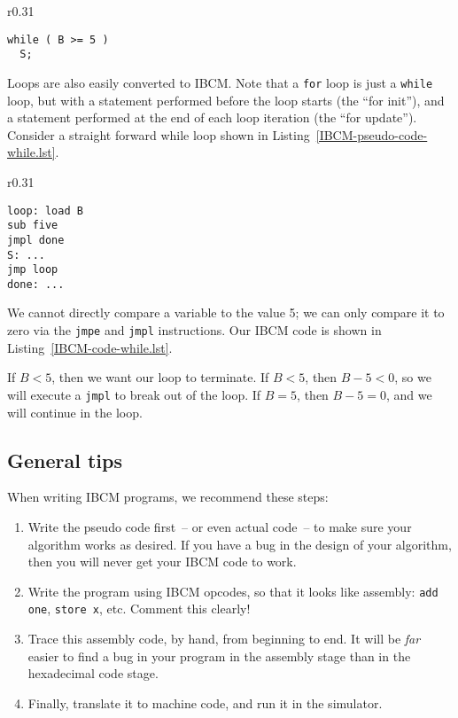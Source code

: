 \begin{wrapfigure}{r}{0.31\textwidth}
\vspace{0.1in}
\begin{lstlisting}[backgroundcolor=\color{white},frame=trBL,linewidth=2in,xleftmargin=0.25in,label={IBCM-pseudo-code-while.lst},caption={{\bf while} pseudo code}]
while ( B >= 5 )
  S;
\end{lstlisting}
\vspace{0.25in}
\end{wrapfigure}

Loops are also easily converted to IBCM.  Note that a {\tt for} loop
is just a {\tt while} loop, but with a statement performed before the
loop starts (the ``for init''), and a statement performed at the end
of each loop iteration (the ``for update'').  Consider a straight
forward while loop shown in Listing~\ref{IBCM-pseudo-code-while.lst}.

\begin{wrapfigure}{r}{0.31\textwidth}
\vspace{-0.7in}
\begin{lstlisting}[backgroundcolor=\color{white},frame=trBL,linewidth=2in,xleftmargin=0.25in,label={IBCM-code-while.lst},caption={IBCM {\bf while} code}]
loop: load B
sub five
jmpl done
S: ...
jmp loop
done: ...
\end{lstlisting}
\vspace{-0.5in}
\end{wrapfigure}

We cannot directly compare a variable to the value 5; we can only
compare it to zero via the {\tt jmpe} and {\tt jmpl} instructions.
Our IBCM code is shown in Listing~\ref{IBCM-code-while.lst}.

If $B<5$, then we want our loop to terminate.  If $B<5$, then $B-5<0$,
so we will execute a {\tt jmpl} to break out of the loop.  If $B=5$,
then $B-5=0$, and we will continue in the loop.

\subsection{General tips}

When writing IBCM programs, we recommend these steps:

\begin{enumerate}
\item Write the pseudo code first~-- or even actual code~-- to make
  sure your algorithm works as desired.  If you have a bug in the
  design of your algorithm, then you will never get your IBCM code to
  work.
\item Write the program using IBCM opcodes, so that it looks like
  assembly: {\tt add one}, {\tt store x}, etc.  Comment this clearly!
\item Trace this assembly code, by hand, from beginning to end.  It
  will be {\em far} easier to find a bug in your program in the
  assembly stage than in the hexadecimal code stage.
\item Finally, translate it to machine code, and run it in the
  simulator.
\end{enumerate}

